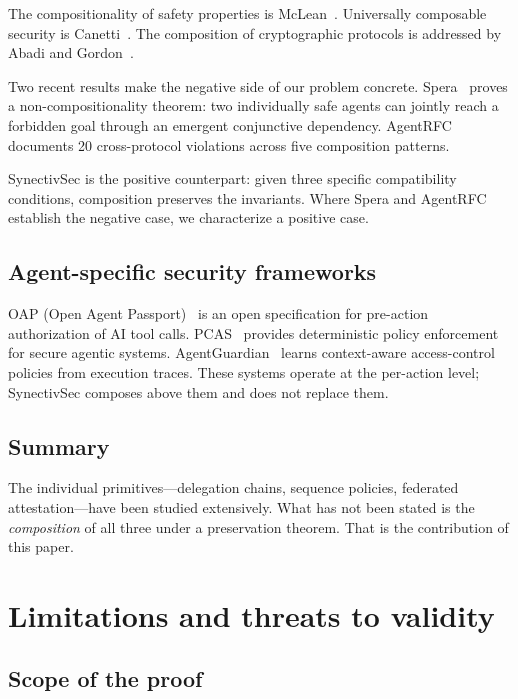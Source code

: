 \documentclass[11pt,a4paper]{article}
\theoremstyle{plain}
\theoremstyle{definition}
\theoremstyle{remark}
\begin{document}
The compositionality of safety properties is McLean~\cite{mclean1994general}.
Universally composable security is Canetti~\cite{canetti2001uc}. The
composition of cryptographic protocols is addressed by Abadi and
Gordon~\cite{abadi1997spi}.

Two recent results make the negative side of our problem concrete.
Spera~\cite{spera2026noncompositionality} proves a non-compositionality
theorem: two individually safe agents can jointly reach a forbidden goal
through an emergent conjunctive dependency. AgentRFC~\cite{agentrfc2026}
documents 20 cross-protocol violations across five composition patterns.

SynectivSec is the positive counterpart: given three specific compatibility
conditions, composition preserves the invariants. Where Spera and AgentRFC
establish the negative case, we characterize a positive case.

\subsection{Agent-specific security frameworks}

OAP (Open Agent Passport)~\cite{oap2026} is an open specification for
pre-action authorization of AI tool calls. PCAS~\cite{pacs2026} provides
deterministic policy enforcement for secure agentic systems.
AgentGuardian~\cite{agentguardian2026} learns context-aware access-control
policies from execution traces. These systems operate at the per-action
level; SynectivSec composes above them and does not replace them.

\subsection{Summary}

The individual primitives---delegation chains, sequence policies, federated
attestation---have been studied extensively. What has not been stated is the
\emph{composition} of all three under a preservation theorem. That is the
contribution of this paper.

\section{Limitations and threats to validity}
\label{sec:limitations}

\subsection*{Scope of the proof}
\end{document}
